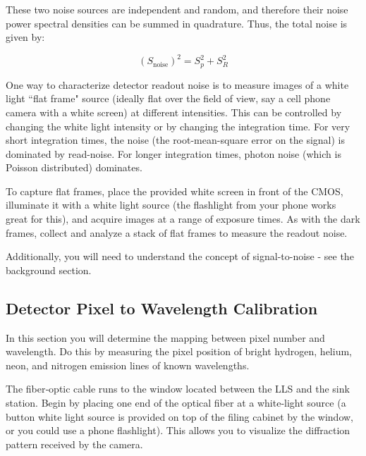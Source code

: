 \documentclass{../lab}
\begin{document}
These two noise sources are independent and random, and therefore their noise power spectral densities can be summed in quadrature. Thus, the total noise is given by:

\begin{equation}
    (S_\text{noise})^2=S_p^2+S_R^2
\end{equation}

One way to characterize detector readout noise is to measure images of a white light ``flat frame" source (ideally flat over the field of view, say a cell phone camera with a white screen) at different intensities. This can be controlled by changing the white light intensity or by changing
the integration time. For very short integration times, the noise (the root-mean-square error on the signal) is dominated by read-noise. For longer integration times, photon noise (which is Poisson distributed) dominates. 

To capture flat frames, place the provided white screen in front of the CMOS, illuminate it with a white light source (the flashlight from your phone works great for this), and acquire images at a range of exposure times. As with the dark frames, collect and analyze a stack of flat frames to measure the readout noise. 



Additionally, you will need to understand the concept of signal-to-noise - see the background section.


\subsection{Detector Pixel to Wavelength Calibration}

In this section you will determine the mapping between pixel number and wavelength. Do this by measuring the pixel position of bright hydrogen, helium, neon, and nitrogen emission lines of known wavelengths. 

The fiber‑optic cable runs to the window located between the LLS and the sink station. Begin by placing one end of the optical fiber at a white‑light source (a button white light source is provided on top of the filing cabinet by the window, or you could use a phone flashlight). This allows you to visualize the diffraction pattern received by the camera. 
\end{document}
